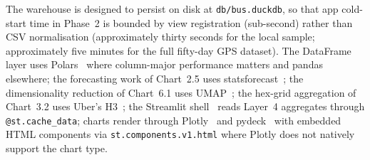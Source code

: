The warehouse is designed to persist on disk at
\texttt{db/bus.duckdb}, so that app cold-start time in Phase~2
is bounded by view registration (sub-second) rather than CSV
normalisation (approximately thirty seconds for the local
sample; approximately five minutes for the full fifty-day GPS
dataset). The DataFrame layer uses Polars~\cite{polars} where
column-major performance matters and pandas elsewhere; the
forecasting work of Chart~2.5 uses
statsforecast~\cite{statsforecast}; the dimensionality reduction
of Chart~6.1 uses UMAP~\cite{umap}; the hex-grid aggregation of
Chart~3.2 uses Uber's H3~\cite{h3}; the Streamlit
shell~\cite{streamlit} reads Layer~4 aggregates through
\texttt{@st.cache\_data}; charts render through
Plotly~\cite{plotly} and pydeck~\cite{pydeck} with embedded HTML
components via \texttt{st.components.v1.html} where Plotly does
not natively support the chart type.
